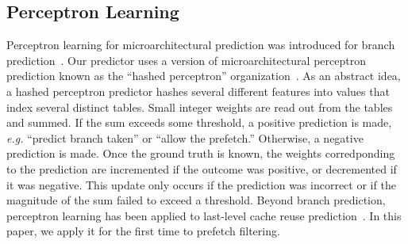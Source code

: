 \subsection{Perceptron Learning}
\label{sec:Background-Perceptron}
Perceptron learning for microarchitectural prediction was introduced
for branch prediction~\cite{PerceptronPredictor}. Our predictor uses a
version of microarchitectural perceptron prediction known as the
``hashed perceptron'' organization~\cite{HashedPerceptron}. As an
abstract idea, a hashed perceptron predictor hashes several different
features into values that index several distinct tables. Small integer
weights are read out from the tables and summed. If the sum exceeds
some threshold, a positive prediction is made, {\em e.g.} ``predict
branch taken'' or ``allow the prefetch.'' Otherwise, a negative
prediction is made. Once the ground truth is known, the weights
corredponding to the prediction are incremented if the outcome was
positive, or decremented if it was negative. This update only occurs
if the prediction was incorrect or if the magnitude of the sum failed
to exceed a threshold.  Beyond branch prediction, perceptron learning
has been applied to last-level cache reuse
prediction~\cite{Perc_Reuse,Multiperspective}. In this paper, we apply
it for the first time to prefetch filtering.




